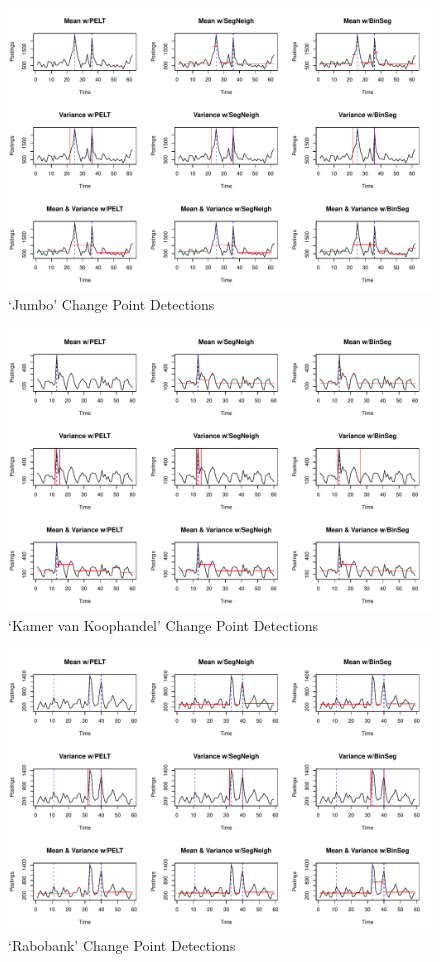 \documentclass[../main.tex]{subfiles}
\begin{document}
\begin{figure}[h]
    \includegraphics[width=\textwidth]{figures/jumboresults}
    \caption{`Jumbo' Change Point Detections}
    \label{fig:jumbo}
\end{figure}

\begin{figure}[h]
    \includegraphics[width=\textwidth]{figures/kvkresults}
    \caption{`Kamer van Koophandel' Change Point Detections}
    \label{fig:kvk}
\end{figure}

\begin{figure}[h]
    \includegraphics[width=\textwidth]{figures/rabobankresults}
    \caption{`Rabobank' Change Point Detections}
    \label{fig:rabobank}
\end{figure}
\end{document}
